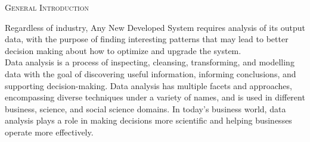 \documentclass[12pt]{extreport}
\begin{document}
\begin{comment}





\newpage
\newglossaryentry{latex}
{
	name=latex,
	description={Is a markup language specially suited 
		for scientific documents}
}

\newglossaryentry{maths}
{
	name=mathematics,
	description={Mathematics is what mathematicians do}
}
\newacronym{MEC}{GCD}{Greatest Common Divisor}

\newacronym{lcm}{LCM}{Least Common Multiple}

\printglossary[type=\acronymtype]

\printglossary

\end{comment}

\newpage
\thispagestyle{empty}
\listoffigures
\cleardoublepage
	



\newpage
\tableofcontents
\thispagestyle{empty}




\newpage
\thispagestyle{empty}
\begin{center}
\textsc{\Huge General Introduction\\[2cm]
}

\end{center} 

Regardless of industry, Any New Developed System  requires analysis of its output data, with the purpose of finding interesting  patterns that may lead to better decision making about how to optimize and upgrade the system.\\


Data analysis is a process of inspecting, cleansing, transforming, and modelling data with the goal of discovering useful information, informing conclusions, and supporting decision-making. Data analysis has multiple facets and approaches, encompassing diverse techniques under a variety of names, and is used in different business, science, and social science domains. In today's business world, data analysis plays a role in making decisions more scientific and helping businesses operate more effectively.\\
\end{document}
